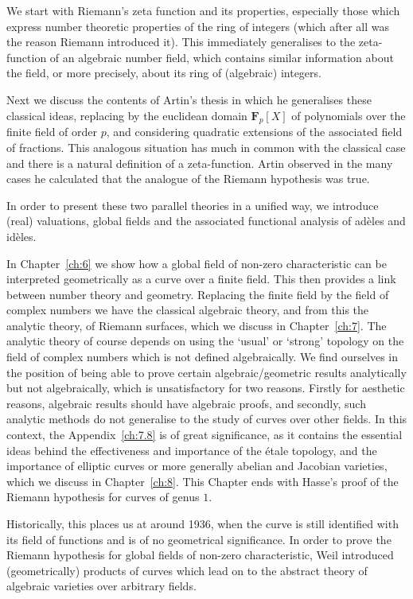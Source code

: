 \documentclass[10pt]{article}
\theoremstyle{definition}
\def\FF{\mathbf{F}}
\def\qw#1{`#1'}
\begin{document}
We start with Riemann's zeta function and its properties, especially those which express number theoretic properties of the ring of integers (which after all was the reason Riemann introduced it).
This immediately generalises to the zeta-function of an algebraic number field, which contains similar information about the field, or more precisely, about its ring of (algebraic) integers.

Next we discuss the contents of Artin's thesis in which he generalises these classical ideas, replacing by the euclidean domain $\FF_p[X]$ of polynomials over the finite field of order $p$, and considering quadratic extensions of the associated field of fractions.
This analogous situation has much in common with the classical case and there is a natural definition of a zeta-function.
Artin observed in the many cases he calculated that the analogue of the Riemann hypothesis was true.

In order to present these two parallel theories in a unified way, we introduce (real) valuations, global fields and the associated functional analysis of ad\`eles and id\`eles.

In Chapter~\ref{ch:6} we show how a global field of non-zero characteristic can be interpreted geometrically as a curve over a finite field.
This then provides a link between number theory and geometry.
Replacing the finite field by the field of complex numbers we have the classical algebraic theory, and from this the analytic theory, of Riemann surfaces, which we discuss in Chapter~\ref{ch:7}.
The analytic theory of course depends on using the \qw{usual} or \qw{strong} topology on the field of complex numbers which is not defined algebraically.
We find ourselves in the position of being able to prove certain algebraic/geometric results analytically but not algebraically, which is unsatisfactory for two reasons.
Firstly for aesthetic reasons, algebraic results should have algebraic proofs, and secondly, such analytic methods do not generalise to the study of curves over other fields.
In this context, the Appendix~\ref{ch:7.8} is of great significance, as it contains the essential ideas behind the effectiveness and importance of the \'etale topology, and the importance of elliptic curves or more generally abelian and Jacobian varieties, which we discuss in Chapter~\ref{ch:8}.
This Chapter ends with Hasse's proof of the Riemann hypothesis for curves of genus $1$.

Historically, this places us at around 1936, when the curve is still identified with its field of functions and is of no geometrical significance.
In order to prove the Riemann hypothesis for global fields of non-zero characteristic, Weil introduced (geometrically) products of curves which lead on to the abstract theory of algebraic varieties over arbitrary fields.
\end{document}
